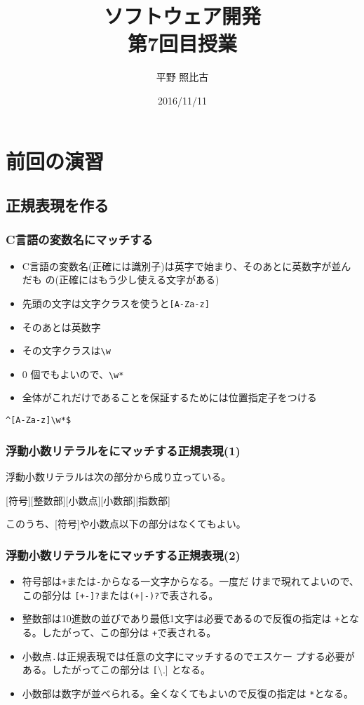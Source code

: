 
\title{ソフトウェア開発\\第7回目授業}
\author{平野 照比古}
\institute{}
\date{2016/11/11}
\newtheorem{Prob}{解説}

\frame{\maketitle}
\newcommand{\Elm}[1]{\texttt{<#1>}}
\section{前回の演習}
\subsection{正規表現を作る}
\begin{frame}[containsverbatim]
 \frametitle{C言語の変数名にマッチする}
\begin{itemize}
 \item C言語の変数名(正確には識別子)は英字で始まり、そのあとに英数字が並んだも
の(正確にはもう少し使える文字がある)
 \item 先頭の文字は文字クラスを使うと\texttt{[A-Za-z]}
 \item そのあとは英数字
 \item その文字クラスは\texttt{\textbackslash w}
 \item $0$ 個でもよいので、\texttt{\textbackslash w*}
 \item 全体がこれだけであることを保証するためには位置指定子をつける
\end{itemize}
{\LARGE
\Verb+^[A-Za-z]\w*$+}
\end{frame}
\begin{frame}[containsverbatim]
 \frametitle{浮動小数リテラルをにマッチする正規表現(1)}
浮動小数リテラルは次の部分から成り立っている。

[符号][整数部][小数点][小数部][指数部]

このうち、[符号]や小数点以下の部分はなくてもよい。

\end{frame}
\begin{frame}[containsverbatim]
 \frametitle{浮動小数リテラルをにマッチする正規表現(2)}
\begin{itemize}
 \item 符号部は\texttt{+}または\texttt{-}からなる一文字からなる。一度だ
       けまで現れてよいので、この部分は \texttt{[+-]?}または\texttt{(+|-)?}で表される。
 \item 整数部は10進数の並びであり最低1文字は必要であるので反復の指定は
       \texttt{+}となる。したがって、この部分は \texttt{\d+}で表される。
 \item 小数点\texttt{.}は正規表現では任意の文字にマッチするのでエスケー
       プする必要がある。したがってこの部分は \texttt[\textbackslash .]
       となる。
 \item 小数部は数字が並べられる。全くなくてもよいので反復の指定は
       \texttt{*}となる。
\end{itemize}
\end{frame}
